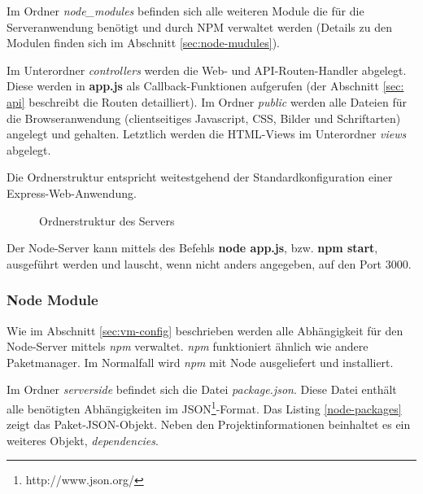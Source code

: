 Im Ordner \textit{node\_modules} befinden sich alle weiteren Module die für die Serveranwendung benötigt und durch NPM verwaltet werden (Details zu den Modulen finden sich im Abschnitt \ref{sec:node-mudules}). 

Im Unterordner \textit{controllers} werden die Web- und API-Routen-Handler abgelegt. 
Diese werden in \textbf{app.js} als Callback-Funktionen aufgerufen (der Abschnitt \ref{sec: api} beschreibt die Routen detailliert). 
Im Ordner \textit{public} werden alle Dateien für die Browseranwendung (clientseitiges Javascript, CSS, Bilder und Schriftarten) angelegt und gehalten. 
Letztlich werden die HTML-Views im Unterordner \textit{views} abgelegt. 

Die Ordnerstruktur entspricht weitestgehend der Standardkonfiguration einer Express-Web-Anwendung.

\begin{figure}[h!]
	\centering
			\begin{minipage}[c]{\textwidth} %
			\end{minipage}
	\caption{Ordnerstruktur des Servers}
	\label{fig:server-tree}
\end{figure}

Der Node-Server kann mittels des Befehls \textbf{node app.js}, bzw. \textbf{npm start}, ausgeführt werden und lauscht, wenn nicht anders angegeben, auf den Port 3000. 

\subsubsection{Node Module \label{sec:node-mudules}}

Wie im Abschnitt \ref{sec:vm-config} beschrieben werden alle Abhängigkeit für den Node-Server mittels \emph{npm} verwaltet. 
\emph{npm} funktioniert ähnlich wie andere Paketmanager. 
Im Normalfall wird \emph{npm} mit Node ausgeliefert und installiert. 

Im Ordner \textit{serverside} befindet sich die Datei \emph{package.json}. Diese Datei enthält alle benötigten Abhängigkeiten im JSON\footnote{http://www.json.org/}-Format. Das Listing \ref{node-packages} zeigt das Paket-JSON-Objekt. 
Neben den Projektinformationen beinhaltet es ein weiteres Objekt, \emph{dependencies}. 

